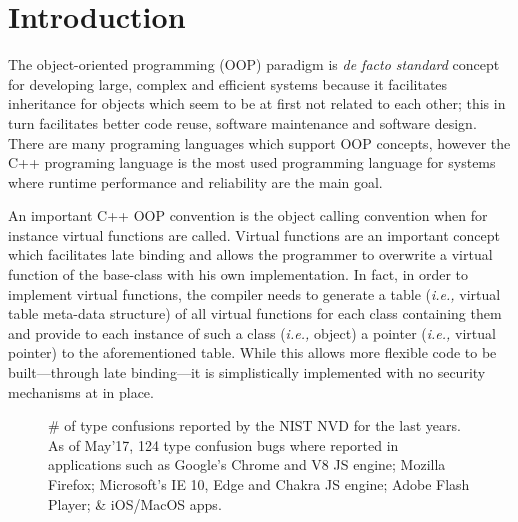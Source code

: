 \section{Introduction}
\label{chapter:Introduction}

The object-oriented programming (OOP) paradigm is \textit{de facto standard} concept for developing large, complex and efficient
systems because it facilitates inheritance for objects which seem to be at first not related to each other; this in turn 
facilitates better code reuse, software maintenance and software design. There are many programing languages
which support OOP concepts, however the C++ programing language is the most used programming language for systems where 
runtime performance and reliability are the main goal.

An important C++ OOP convention is the object calling convention when for instance virtual functions are called.
Virtual functions are an important concept which facilitates late binding and allows the programmer to overwrite a
virtual function of the base-class with his own implementation. In fact, in order to implement virtual functions, 
the compiler needs to generate a table (\textit{i.e.,} virtual table meta-data structure) of all
virtual functions for each class containing them and provide to each instance of such a class (\textit{i.e.,} object) a pointer (\textit{i.e.,} virtual pointer)
to the aforementioned table. While this allows more flexible code to be built---through late binding---it is simplistically implemented with no security
mechanisms at in place.

\begin{figure}[t!]
\centering
{}
\vspace{-.5cm}
\caption{\# of type confusions reported by the NIST NVD for the last years. 
As of May'17, 124 type confusion bugs where reported in applications such as Google's Chrome and V8 JS engine; Mozilla Firefox; Microsoft's IE 10, Edge and Chakra JS engine; Adobe Flash Player;
\& iOS/MacOS apps.}
\label{typeconfusion:nvd:statistics}
\vspace{-.7cm}
\end{figure}

